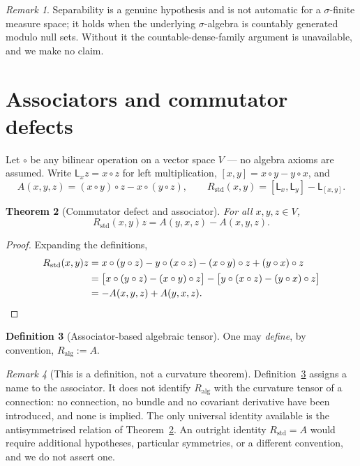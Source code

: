 \documentclass[11pt]{amsart}
\newtheorem{theorem}{Theorem}[section]
\theoremstyle{definition}
\newtheorem{definition}[theorem]{Definition}
\theoremstyle{remark}
\newtheorem{remark}[theorem]{Remark}
\begin{document}
\begin{remark}
\label{rem:separability}
Separability is a genuine hypothesis and is not automatic for a $\sigma$-finite measure
space; it holds when the underlying $\sigma$-algebra is countably generated modulo null
sets. Without it the countable-dense-family argument is unavailable, and we make no claim.
\end{remark}

\section{Associators and commutator defects}
\label{sec:curvature}

Let $\circ$ be any bilinear operation on a vector space $V$ --- no algebra axioms are
assumed. Write $\mathsf L_xz=x\circ z$ for left multiplication, $[x,y]=x\circ y-y\circ x$,
and
\[
 A(x,y,z)=(x\circ y)\circ z-x\circ(y\circ z),
 \qquad
 R_{\mathrm{std}}(x,y)=[\mathsf L_x,\mathsf L_y]-\mathsf L_{[x,y]}.
\]

\begin{theorem}[Commutator defect and associator]
\label{thm:commutator}
For all $x,y,z\in V$,
\[
 R_{\mathrm{std}}(x,y)z=A(y,x,z)-A(x,y,z).
\]
\end{theorem}

\begin{proof}
Expanding the definitions,
\begin{align*}
 R_{\mathrm{std}}(x,y)z
 &=x\circ(y\circ z)-y\circ(x\circ z)-(x\circ y)\circ z+(y\circ x)\circ z\\
 &=\bigl[x\circ(y\circ z)-(x\circ y)\circ z\bigr]
 -\bigl[y\circ(x\circ z)-(y\circ x)\circ z\bigr]\\
 &=-A(x,y,z)+A(y,x,z).\qedhere
\end{align*}
\end{proof}

\begin{definition}[Associator-based algebraic tensor]
\label{def:ralg}
One may \emph{define}, by convention, $R_{\mathrm{alg}}:=A$.
\end{definition}

\begin{remark}[This is a definition, not a curvature theorem]
\label{rem:notcurvature}
Definition~\ref{def:ralg} assigns a name to the associator. It does not identify
$R_{\mathrm{alg}}$ with the curvature tensor of a connection: no connection, no bundle and
no covariant derivative have been introduced, and none is implied. The only universal
identity available is the antisymmetrised relation of Theorem~\ref{thm:commutator}. An
outright identity $R_{\mathrm{std}}=A$ would require additional hypotheses, particular
symmetries, or a different convention, and we do not assert one.
\end{remark}
\end{document}
